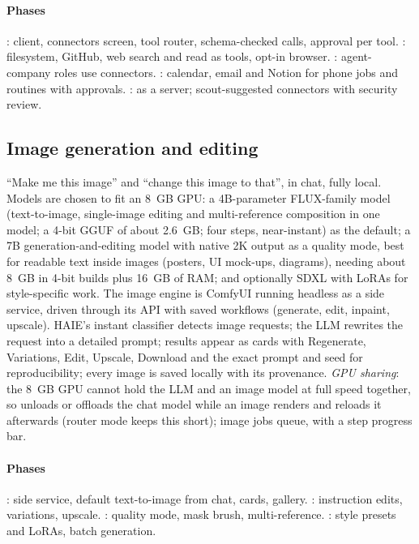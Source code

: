 \paragraph{Phases} : client, connectors screen, tool router, schema-checked calls, approval per tool. : filesystem, GitHub, web search and read as tools, opt-in browser. : agent-company roles use connectors. : calendar, email and Notion for phone jobs and routines with approvals. : \hivi{} as a server; scout-suggested connectors with security review.

\subsection{Image generation and editing}

``Make me this image'' and ``change this image to that'', in chat, fully local. Models are chosen to fit an 8~GB GPU: a 4B-parameter FLUX-family model (text-to-image, single-image editing and multi-reference composition in one model; a 4-bit GGUF of about 2.6~GB; four steps, near-instant) as the default; a 7B generation-and-editing model with native 2K output as a quality mode, best for readable text inside images (posters, UI mock-ups, diagrams), needing about 8~GB in 4-bit builds plus 16~GB of RAM; and optionally SDXL with LoRAs for style-specific work. The image engine is ComfyUI running headless as a \hivi{} side service, driven through its API with saved workflows (generate, edit, inpaint, upscale). HAIE's instant classifier detects image requests; the LLM rewrites the request into a detailed prompt; results appear as cards with Regenerate, Variations, Edit, Upscale, Download and the exact prompt and seed for reproducibility; every image is saved locally with its provenance. \emph{GPU sharing}: the 8~GB GPU cannot hold the LLM and an image model at full speed together, so \hivi{} unloads or offloads the chat model while an image renders and reloads it afterwards (router mode keeps this short); image jobs queue, with a step progress bar.

\paragraph{Phases} : side service, default text-to-image from chat, cards, gallery. : instruction edits, variations, upscale. : quality mode, mask brush, multi-reference. : style presets and LoRAs, batch generation.

